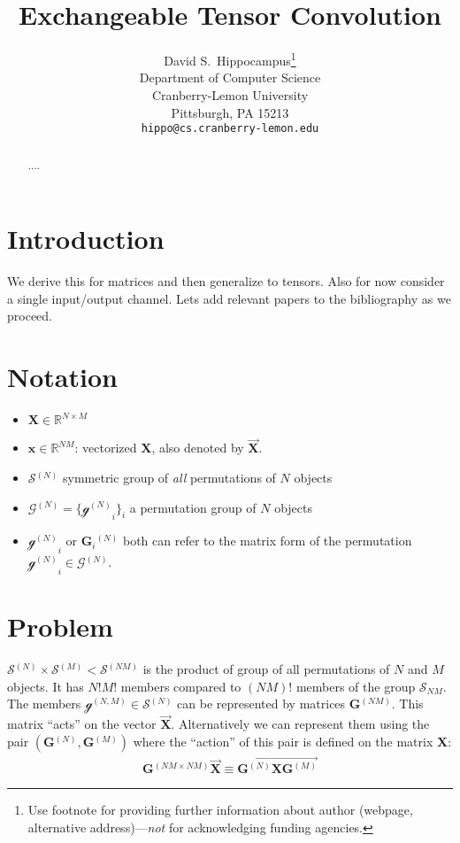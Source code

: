 \documentclass{article}
\title{Exchangeable Tensor Convolution}
\author{
  David S.~Hippocampus\thanks{Use footnote for providing further
    information about author (webpage, alternative
    address)---\emph{not} for acknowledging funding agencies.} \\
  Department of Computer Science\\
  Cranberry-Lemon University\\
  Pittsburgh, PA 15213 \\
  \texttt{hippo@cs.cranberry-lemon.edu} \\
}
\newcommand{\mat}[1]{\ensuremath{\mathbf{#1}}}
\newcommand{\gr}[1]{\ensuremath{\mathcal{#1}}}
\newcommand{\set}[1]{\ensuremath{\mathbb{#1}}}
\renewcommand{\vec}[1]{\ensuremath{\overrightarrow{#1}}}
\newcommand{\prm}[1]{\ensuremath{^{(#1)}}}
\newcommand{\grn}[2]{\ensuremath{\gr{#1}\prm{#2}}}
\newcommand{\XX}[0]{\ensuremath{\mat{X}}}
\newcommand{\xx}[0]{\ensuremath{\mat{x}}}
\renewcommand{\Re}[0]{\ensuremath{\set{R}}}
\theoremstyle{definition}
\begin{document}

\maketitle

\begin{abstract}
....
\end{abstract}
\section{Introduction}
We derive this for matrices and then generalize to tensors.
Also for now consider a single input/output channel.
Lets add relevant papers to the bibliography as we proceed.

\section{Notation}
\begin{itemize}
\item $\XX \in \Re^{N \times M}$
\item $\xx \in \Re^{N M}$: vectorized $\XX$, also denoted by $\vec{\XX}$.
\item $\grn{S}{N}$ symmetric group of \textit{all} permutations of $N$ objects
\item $\grn{G}{N} = \{\grn{g}{N}_i\}_i$ a permutation group of $N$ objects 
\item $\grn{g}{N}_i$ or $\mat{G}_i\prm{N}$ both can refer to the matrix form of the permutation $\grn{g}{N}_i \in \grn{G}{N}$.
\end{itemize}

\section{Problem}
$\grn{S}{N} \times \grn{S}{M} < \grn{S}{N M}$ is the product of group of all permutations of $N$ and $M$ objects. It has $N! M!$ members compared to $(NM)!$ members of the group $\gr{S}_{N M}$.
The members $\grn{g}{N,M} \in \grn{S}{N}$ can be represented by matrices $\mat{G}\prm{N M}$. This matrix ``acts'' on the vector $\vec{\XX}$.
Alternatively we can represent them using the pair $(\mat{G}\prm{N}, \mat{G}\prm{M})$ where the ``action'' of this pair is defined on the matrix $\XX$:
\begin{align*}
  \mat{G}\prm{N M \times N M} \vec{\XX} \equiv \vec{\mat{G}\prm{N} \XX \mat{G}\prm{M}}
\end{align*}
\end{document}
